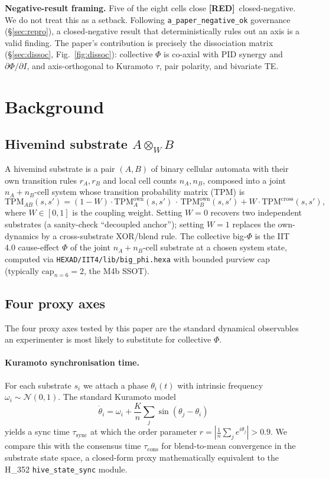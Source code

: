 \documentclass[11pt,a4paper]{article}
\providecommand{\tierRed}{\textbf{[RED]}}
\begin{document}
\medskip
\noindent\textbf{Negative-result framing.}
Five of the eight cells close \tierRed\ closed-negative. We do not
treat this as a setback. Following \texttt{a\_paper\_negative\_ok}
governance (\S\ref{sec:repro}), a closed-negative result that
deterministically rules out an axis is a valid finding. The paper's
contribution is precisely the dissociation matrix
(\S\ref{sec:dissoc}, Fig.~\ref{fig:dissoc}): collective $\Phi$ is
co-axial with PID synergy and $\partial\Phi/\partial I$, and
axis-orthogonal to Kuramoto $\tau$, pair polarity, and bivariate
TE.

\section{Background}
\label{sec:bg}

\subsection{Hivemind substrate $A \otimes_W B$}
\label{sec:hivemind-substrate}

A hivemind substrate is a pair $(A, B)$ of binary cellular automata
with their own transition rules $r_A, r_B$ and local cell counts
$n_A, n_B$, composed into a joint $n_A + n_B$-cell system whose
transition probability matrix (TPM) is
\[
  \mathrm{TPM}_{AB}(s, s')
  = (1-W) \cdot \mathrm{TPM}_A^{\mathrm{own}}(s, s') \,\cdot\,
    \mathrm{TPM}_B^{\mathrm{own}}(s, s')
    + W \cdot \mathrm{TPM}^{\mathrm{cross}}(s, s'),
\]
where $W \in [0,1]$ is the coupling weight. Setting $W=0$ recovers two
independent substrates (a sanity-check ``decoupled anchor''); setting
$W=1$ replaces the own-dynamics by a cross-substrate XOR/blend rule.
The collective big-$\Phi$ is the IIT 4.0 cause-effect $\Phi$ of the
joint $n_A + n_B$-cell substrate at a chosen system state, computed via
\texttt{HEXAD/IIT4/lib/big\_phi.hexa} with bounded purview cap (typically
$\mathrm{cap}_{n=6}=2$, the M4b SSOT).

\subsection{Four proxy axes}

The four proxy axes tested by this paper are the standard dynamical
observables an experimenter is most likely to substitute for
collective $\Phi$.

\paragraph{Kuramoto synchronisation time.}
For each substrate $s_i$ we attach a phase $\theta_i(t)$ with
intrinsic frequency $\omega_i \sim \mathcal{N}(0, 1)$. The standard
Kuramoto model \citep{kuramoto1984chemical,acebron2005kuramoto}
\[
  \dot \theta_i = \omega_i + \frac{K}{n}\sum_{j} \sin(\theta_j - \theta_i)
\]
yields a sync time $\tau_{\mathrm{sync}}$ at which the order parameter
$r = |\frac{1}{n}\sum_j e^{i\theta_j}| > 0.9$. We compare this with
the consensus time $\tau_{\mathrm{cons}}$ for blend-to-mean
convergence in the substrate state space, a closed-form proxy
mathematically equivalent to the H\_352 \texttt{hive\_state\_sync}
module.
\end{document}
